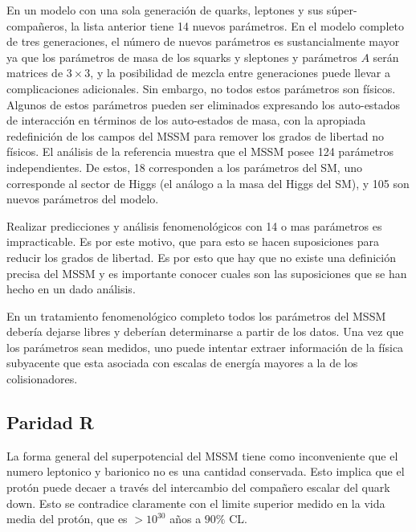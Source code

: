 En un modelo con una sola generación de quarks, leptones y sus
súper-compa\~neros, la lista anterior tiene 14 nuevos parámetros. En
el modelo completo de tres generaciones, el número de nuevos
parámetros es sustancialmente mayor ya que los parámetros de masa de
los squarks y sleptones y parámetros $A$ serán matrices de $3 \times
3$, y la posibilidad de mezcla entre generaciones puede llevar a
complicaciones adicionales. Sin embargo, no todos estos parámetros son
físicos. Algunos de estos parámetros pueden ser eliminados expresando
los auto-estados de interacción en términos de los auto-estados de
masa, con la apropiada redefinición de los campos del MSSM para
remover los grados de libertad no físicos. El análisis de la
referencia \cite{Dimopoulos:1995ju} muestra que el MSSM posee 124
parámetros independientes. De estos, 18 corresponden a los parámetros
del SM, uno corresponde al sector de Higgs (el análogo a la masa del
Higgs del SM), y 105 son nuevos parámetros del modelo.

Realizar predicciones y análisis fenomenológicos con 14 o mas
parámetros es impracticable. Es por este motivo, que para esto se
hacen suposiciones para reducir los grados de libertad. Es por esto
que hay que no existe una definición precisa del MSSM y es importante
conocer cuales son las suposiciones que se han hecho en un dado
análisis.

En un tratamiento fenomenológico completo todos los parámetros del
MSSM debería dejarse libres y deberían determinarse a partir de los
datos. Una vez que los parámetros sean medidos, uno puede intentar
extraer información de la física subyacente que esta asociada con
escalas de energía mayores a la de los colisionadores.


\subsection{Paridad R}

La forma general del superpotencial del MSSM tiene como inconveniente
que el numero leptonico y barionico no es una cantidad conservada.
Esto implica que el protón puede decaer a través del intercambio del
compañero escalar del quark down. Esto se contradice claramente con el
limite superior medido en la vida media del protón, que es $> 10^{30}$
a\~nos a $90\%$ CL\cite{PDG}.


